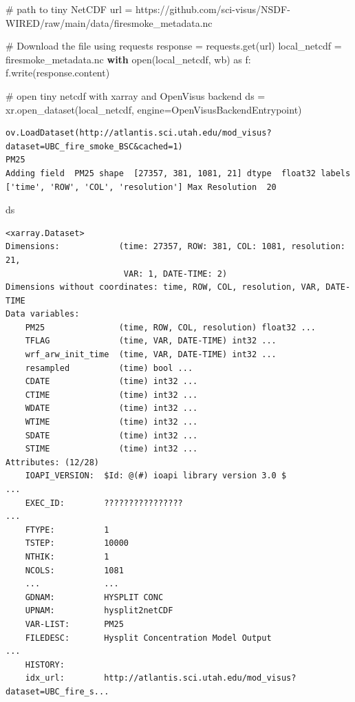 \documentclass[
  letterpaper,
  DIV=11,
  numbers=noendperiod]{scrreprt}
\newenvironment{Shaded}{\begin{snugshade}}{\end{snugshade}}
\newcommand{\BuiltInTok}[1]{\textcolor[rgb]{0.00,0.23,0.31}{#1}}
\newcommand{\CommentTok}[1]{\textcolor[rgb]{0.37,0.37,0.37}{#1}}
\newcommand{\ControlFlowTok}[1]{\textcolor[rgb]{0.00,0.23,0.31}{\textbf{#1}}}
\newcommand{\ImportTok}[1]{\textcolor[rgb]{0.00,0.46,0.62}{#1}}
\newcommand{\NormalTok}[1]{\textcolor[rgb]{0.00,0.23,0.31}{#1}}
\newcommand{\OperatorTok}[1]{\textcolor[rgb]{0.37,0.37,0.37}{#1}}
\newcommand{\StringTok}[1]{\textcolor[rgb]{0.13,0.47,0.30}{#1}}
\begin{document}
\begin{Shaded}
\begin{Highlighting}[]
\CommentTok{\# path to tiny NetCDF}
\NormalTok{url }\OperatorTok{=} \StringTok{\textquotesingle{}https://github.com/sci{-}visus/NSDF{-}WIRED/raw/main/data/firesmoke\_metadata.nc\textquotesingle{}}

\CommentTok{\# Download the file using requests}
\NormalTok{response }\OperatorTok{=}\NormalTok{ requests.get(url)}
\NormalTok{local\_netcdf }\OperatorTok{=} \StringTok{\textquotesingle{}firesmoke\_metadata.nc\textquotesingle{}}
\ControlFlowTok{with} \BuiltInTok{open}\NormalTok{(local\_netcdf, }\StringTok{\textquotesingle{}wb\textquotesingle{}}\NormalTok{) }\ImportTok{as}\NormalTok{ f:}
\NormalTok{    f.write(response.content)}
    
\CommentTok{\# open tiny netcdf with xarray and OpenVisus backend}
\NormalTok{ds }\OperatorTok{=}\NormalTok{ xr.open\_dataset(local\_netcdf, engine}\OperatorTok{=}\NormalTok{OpenVisusBackendEntrypoint)}
\end{Highlighting}
\end{Shaded}

\begin{verbatim}
ov.LoadDataset(http://atlantis.sci.utah.edu/mod_visus?dataset=UBC_fire_smoke_BSC&cached=1)
PM25
Adding field  PM25 shape  [27357, 381, 1081, 21] dtype  float32 labels  ['time', 'ROW', 'COL', 'resolution'] Max Resolution  20
\end{verbatim}

\begin{Shaded}
\begin{Highlighting}[]
\NormalTok{ds}
\end{Highlighting}
\end{Shaded}

\begin{verbatim}
<xarray.Dataset>
Dimensions:            (time: 27357, ROW: 381, COL: 1081, resolution: 21,
                        VAR: 1, DATE-TIME: 2)
Dimensions without coordinates: time, ROW, COL, resolution, VAR, DATE-TIME
Data variables:
    PM25               (time, ROW, COL, resolution) float32 ...
    TFLAG              (time, VAR, DATE-TIME) int32 ...
    wrf_arw_init_time  (time, VAR, DATE-TIME) int32 ...
    resampled          (time) bool ...
    CDATE              (time) int32 ...
    CTIME              (time) int32 ...
    WDATE              (time) int32 ...
    WTIME              (time) int32 ...
    SDATE              (time) int32 ...
    STIME              (time) int32 ...
Attributes: (12/28)
    IOAPI_VERSION:  $Id: @(#) ioapi library version 3.0 $                    ...
    EXEC_ID:        ????????????????                                         ...
    FTYPE:          1
    TSTEP:          10000
    NTHIK:          1
    NCOLS:          1081
    ...             ...
    GDNAM:          HYSPLIT CONC    
    UPNAM:          hysplit2netCDF  
    VAR-LIST:       PM25            
    FILEDESC:       Hysplit Concentration Model Output                       ...
    HISTORY:        
    idx_url:        http://atlantis.sci.utah.edu/mod_visus?dataset=UBC_fire_s...
\end{verbatim}
\end{document}
